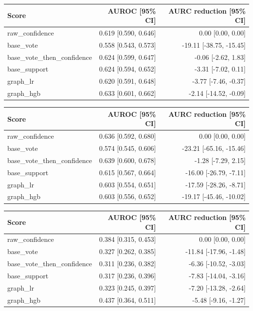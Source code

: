 \begin{tabular}{lrr}
\hline
Score & AUROC [95\% CI] & AURC reduction [95\% CI] \\
\hline
raw\_confidence & 0.619 [0.590, 0.646] & 0.00 [0.00, 0.00] \\
base\_vote & 0.558 [0.543, 0.573] & -19.11 [-38.75, -15.45] \\
base\_vote\_then\_confidence & 0.624 [0.599, 0.647] & -0.06 [-2.62, 1.83] \\
base\_support & 0.624 [0.594, 0.652] & -3.31 [-7.02, 0.11] \\
graph\_lr & 0.620 [0.591, 0.648] & -3.77 [-7.46, -0.37] \\
graph\_hgb & 0.633 [0.601, 0.662] & -2.14 [-14.52, -0.09] \\
\hline
\end{tabular}

\begin{tabular}{lrr}
\hline
Score & AUROC [95\% CI] & AURC reduction [95\% CI] \\
\hline
raw\_confidence & 0.636 [0.592, 0.680] & 0.00 [0.00, 0.00] \\
base\_vote & 0.574 [0.545, 0.606] & -23.21 [-65.16, -15.46] \\
base\_vote\_then\_confidence & 0.639 [0.600, 0.678] & -1.28 [-7.29, 2.15] \\
base\_support & 0.615 [0.567, 0.664] & -16.00 [-26.79, -7.11] \\
graph\_lr & 0.603 [0.554, 0.651] & -17.59 [-28.26, -8.71] \\
graph\_hgb & 0.603 [0.556, 0.652] & -19.17 [-45.46, -10.02] \\
\hline
\end{tabular}

\begin{tabular}{lrr}
\hline
Score & AUROC [95\% CI] & AURC reduction [95\% CI] \\
\hline
raw\_confidence & 0.384 [0.315, 0.453] & 0.00 [0.00, 0.00] \\
base\_vote & 0.327 [0.262, 0.385] & -11.84 [-17.96, -1.48] \\
base\_vote\_then\_confidence & 0.311 [0.236, 0.382] & -6.36 [-10.52, -3.03] \\
base\_support & 0.317 [0.236, 0.396] & -7.83 [-14.04, -3.16] \\
graph\_lr & 0.323 [0.245, 0.397] & -7.20 [-13.28, -2.64] \\
graph\_hgb & 0.437 [0.364, 0.511] & -5.48 [-9.16, -1.27] \\
\hline
\end{tabular}

